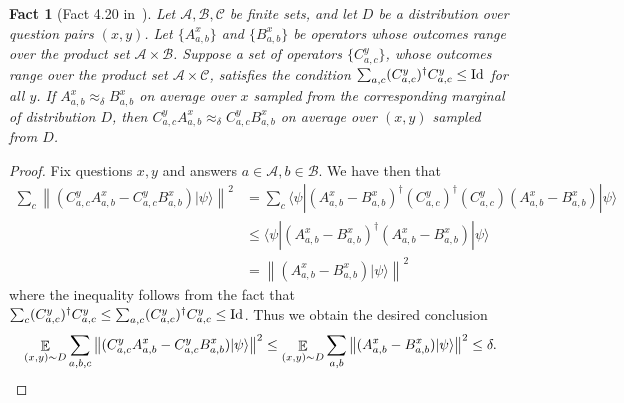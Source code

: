 \documentclass{book}
\theoremstyle{plain}
\newtheorem{fact}[subsection]{Fact}
\theoremstyle{definition}
\theoremstyle{remark}
\numberwithin{equation}{subsection}
\newcommand{\cal}[1]{\mathcal{#1}}
\newcommand{\E}{\mathop{\mathbb{E}}\displaylimits} %
\newcommand{\Id}{\ensuremath{\mathop{\rm Id}\nolimits}}
\newcommand{\ket}[1]{|#1\rangle}
\newcommand{\bra}[1]{\langle#1|}
\begin{document}
\begin{fact}[Fact 4.20 in~\cite{NW19}]
  \label{fact:add-a-proj}
  Let $\cal{A},\cal{B},\cal{C}$ be finite sets, and let $D$ be a distribution
  over question pairs $(x,y)$.
  Let $\{A_{a,b}^x\}$ and $\{B_{a,b}^x\}$ be operators whose outcomes range over the
  product set $\cal{A} \times \cal{B}$.
  Suppose a set of operators $\{C_{a,c}^y\}$, whose outcomes range over the
  product set $\cal{A} \times \cal{C}$, satisfies the condition $\sum_{a,c}
  (C_{a,c}^y)^\dagger C_{a,c}^y \leq \Id$ for all $y$.
  If $A_{a,b}^x \approx_\delta B_{a,b}^x$ on average over $x$ sampled from the
  corresponding marginal of distribution $D$, then $C^y_{a,c} A^x_{a,b}
  \approx_\delta C^y_{a,c} B^x_{a,b}$ on average over $(x,y)$ sampled from $D$.
\end{fact}
\begin{proof}
  Fix questions $x,y$ and answers $a \in \cal{A},b \in \cal{B}$. We have then that
  \begin{align}
    \sum_{c} \left \| (C^y_{a,c} A^x_{a,b} - C^y_{a,c} B^x_{a,b} ) \ket{\psi} \right \|^2
    & = \sum_{c} \bra{\psi} (A^x_{a,b} - B^x_{a,b})^\dagger (C^y_{a,c})^\dagger (C^y_{a,c})
      (A^x_{a,b} - B^x_{a,b} ) \ket{\psi}\\
    & \leq \bra{\psi} (A^x_{a,b} - B^x_{a,b})^\dagger
      (A^x_{a,b} - B^x_{a,b} ) \ket{\psi} \\
    & = \left \| (A^x_{a,b} - B^x_{a,b})\ket{\psi} \right \|^2
  \end{align}
  where the inequality follows from the fact that $\sum_c (C_{a,c}^y)^\dagger
  C_{a,c}^y \leq \sum_{a,c} (C_{a,c}^y)^\dagger C_{a,c}^y \leq \Id$.
  Thus we obtain the desired conclusion
  \begin{equation*}
    \E_{(x,y) \sim D} \sum_{a,b,c} \left \| (C^y_{a,c} A^x_{a,b} - C^y_{a,c} B^x_{a,b} )
      \ket{\psi} \right \|^2 	\leq \E_{(x,y) \sim D} \sum_{a,b}
    \left \| (A^x_{a,b} - B^x_{a,b})\ket{\psi} \right \|^2 \leq \delta.
  \end{equation*}
\end{proof}
\end{document}

